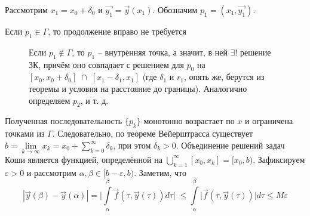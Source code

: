 Рассмотрим $x_1 = x_0 + \delta_0$ и $\vec{y_1} = \vec{y}(x_1)$. Обозначим $p_1=(x_1,\vec{y_1})$.
\begin{itemize}
    \item Если $p_1 \in \Gamma$, то продолжение вправо не требуется 
    \begin{figure}[h]
    \hspace{5.2ex}
    \begin{minipage}[h]{0.5\linewidth}
    \item Если $p_1 \notin \Gamma$, то $p_1$ -- внутренняя точка,
а значит, в ней $\exists!$ решение ЗК, причём оно совпадает с
решением для $p_0$ на $[x_0, x_0 + \delta_0]\; \cap \; [x_1 - \delta_1, x_1]$ (где $\delta_1$ и $r_1$, опять же, берутся из теоремы и
условия на расстояние до границы). \newline Аналогично определяем $p_2$, и т. д.
    \end{minipage}
    \hfill
    \hspace{-4ex} \begin{minipage}[h]{0.5\linewidth}
    \end{minipage}
\end{figure}
\end{itemize}
\vspace{-2ex}
Полученная последовательность $\{p_k\}$ монотонно возрастает по $x$ и ограничена точками из $\Gamma$. \newline Следовательно, по теореме Вейерштрасса существует
$b = \lim\limits_{k\to\infty}x_k=x_0 + \sum\limits_{k=0}^{\infty}\delta_k$, при этом $\delta_k > 0$. \newline Объединение решений задач Коши
является функцией, определённой на $\bigcup\limits_{k=1}^{\infty}[x_0, x_k] = [x_0,b)$. \newline
Зафиксируем $\varepsilon > 0$ и рассмотрим
$\alpha, \beta \in [b - \varepsilon, b)$. Заметим, что
\begin{equation*}
    |\vec{y}(\beta)-\vec{y}(\alpha)| = \bigg|\int\limits_{\alpha}^{\beta}\vec{f}(\tau, \vec{y}(\tau))d\tau\bigg| \; \leqslant \int\limits_{\alpha}^{\beta}\Big|\vec{f}(\tau, \vec{y}(\tau))\Big|d\tau \leqslant M\varepsilon
\end{equation*}
